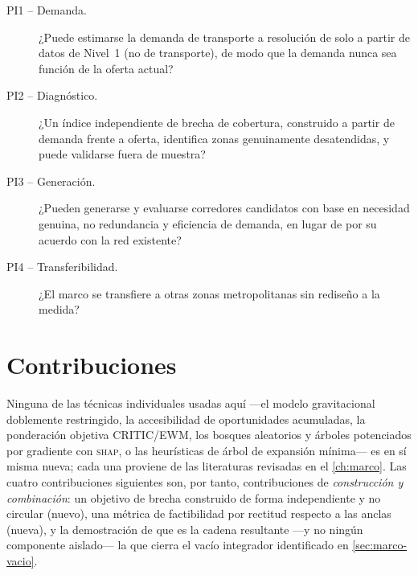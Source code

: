 \begin{description}
  \item[PI1 -- Demanda.] ¿Puede estimarse la demanda de transporte a resolución de
    \ageb solo a partir de datos de Nivel~1 (no de transporte), de modo que la demanda
    nunca sea función de la oferta actual?
  \item[PI2 -- Diagnóstico.] ¿Un índice independiente de brecha de cobertura, construido
    a partir de demanda frente a oferta, identifica zonas genuinamente desatendidas, y
    puede validarse fuera de muestra?
  \item[PI3 -- Generación.] ¿Pueden generarse y evaluarse corredores candidatos con base
    en necesidad genuina, no redundancia y eficiencia de demanda, en lugar de por su
    acuerdo con la red existente?
  \item[PI4 -- Transferibilidad.] ¿El marco se transfiere a otras zonas metropolitanas
    sin rediseño a la medida?
\end{description}

\section{Contribuciones}
\label{sec:intro-contribuciones}

Ninguna de las técnicas individuales usadas aquí ---el modelo gravitacional doblemente
restringido, la accesibilidad de oportunidades acumuladas, la ponderación objetiva
CRITIC/EWM, los bosques aleatorios y árboles potenciados por gradiente con \textsc{shap}, o
las heurísticas de árbol de expansión mínima--- es en sí misma nueva; cada una proviene de
las literaturas revisadas en el \cref{ch:marco}. Las cuatro contribuciones siguientes son,
por tanto, contribuciones de \emph{construcción y combinación}: un objetivo de brecha
construido de forma independiente y no circular (nuevo), una métrica de factibilidad por
rectitud respecto a las anclas (nueva), y la demostración de que es la cadena resultante
---y no ningún componente aislado--- la que cierra el vacío integrador identificado en
\cref{sec:marco-vacio}.

